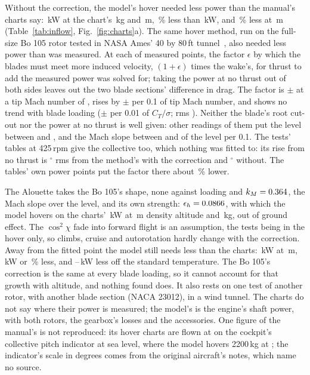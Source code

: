 \documentclass[10pt,a4paper,twocolumn]{article}
\begin{document}
Without the correction, the model's hover needed less power than the manual's charts say: \NWoFit\,kW at the chart's \NFitKg\,kg and
\NFitAltM\,m, \NWoFitPct\,\% less than \NChartKw\,kW, and \NWoTopPct\,\% less at \NTopAltM\,m (Table~\ref{tab:inflow},
Fig.~\ref{fig:charts}a). The same hover method, run on the full-size Bo 105 rotor tested in NASA Ames' 40 by 80\,ft
tunnel~\cite{bo92,bo90}, also needed less power than was measured. At each of \NBoPoints{} measured points, the factor $\epsilon$ by
which the blades must meet more induced velocity, $(1+\epsilon)$ times the wake's, for thrust to add the measured power was solved for;
taking the power at no thrust out of both sides leaves out the two blade sections' difference in drag. The factor is
\NBoLevel$\pm$\NBoLevelErr{} at a tip Mach number of \NViMachZero, rises by \NBoMachSlope$\pm$\NBoMachErr{} per 0.1 of tip Mach
number, and shows no trend with blade loading (\NBoLoadSlope$\pm$\NBoLoadErr{} per 0.01 of $C_T/\sigma$; rms \NBoRms). Neither the
blade's root cut-out nor the power at no thrust is well given: other readings of them put the level between \NBoSensLo{} and \NBoSensHi,
and the Mach slope between \NBoSensMachLo{} and \NBoSensMachHi{} of the level per 0.1. The tests' tables at 425\,rpm give the collective
too, which nothing was fitted to: its rise from no thrust is \NBoPitchWith$^\circ$ rms from the method's with the correction and
\NBoPitchWithout$^\circ$ without. The tables' own power points put the factor there about \NBoTablePct\,\% lower.

The Alouette takes the Bo 105's shape, none against loading and $k_M=0.364$, the Mach slope over the level, and its own strength:
$\epsilon_h=0.0866$, with which the model hovers on the charts' \NChartKw\,kW at \NFitAltM\,m density altitude and \NFitKg\,kg,
out of ground effect. The $\cos^2\chi$ fade into forward flight is an assumption, the tests being in the hover only, so climbs, cruise
and autorotation hardly change with the correction. Away from the fitted point the model still needs less than the charts: \NWTop\,kW at
\NTopAltM\,m, \NWTopShort\,kW or \NWTopPct\,\% less, and \NOffShortLo--\NOffShortHi\,kW less off the standard temperature. The Bo 105's
correction is the same at every blade loading, so it cannot account for that growth with altitude, and nothing found does. It also
rests on one test of another rotor, with another blade section (NACA 23012), in a wind tunnel. The charts do not say where their power
is measured; the model's is the engine's shaft power, with both rotors, the gearbox's losses and the accessories. One figure of the
manual's is not reproduced: its hover charts are flown at \NGaugeManual{} on the cockpit's collective pitch indicator at sea level,
where the model hovers 2200\,kg at \NGaugeModel; the indicator's scale in degrees comes from the original aircraft's notes, which name
no source.
\end{document}
